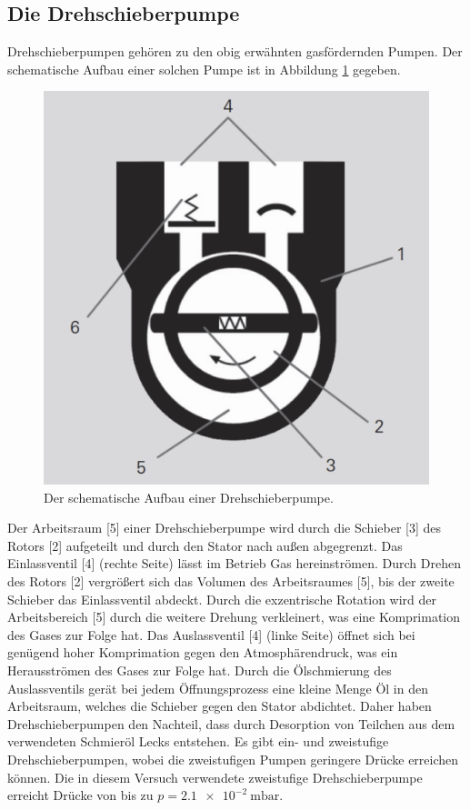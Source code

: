\subsection{Die Drehschieberpumpe}
Drehschieberpumpen gehören zu den obig erwähnten gasfördernden Pumpen. Der schematische
Aufbau einer solchen Pumpe ist in Abbildung \ref{fig:drehschieber} gegeben.
\begin{figure}[H]
  \centering
  \caption{Der schematische Aufbau einer Drehschieberpumpe.}
  \label{fig:drehschieber}
  \includegraphics[scale=0.3]{pictures/drehschieber.png}
\end{figure}
\noindent
Der Arbeitsraum [5] einer Drehschieberpumpe wird durch die Schieber [3] des
Rotors [2] aufgeteilt und durch den Stator nach außen abgegrenzt.
Das Einlassventil [4] (rechte Seite) lässt im Betrieb Gas hereinströmen.
Durch Drehen des Rotors [2] vergrößert sich das Volumen des Arbeitsraumes [5], bis der zweite Schieber
das Einlassventil abdeckt. Durch die exzentrische Rotation wird der Arbeitsbereich [5] durch die
weitere Drehung verkleinert, was eine Komprimation des Gases zur Folge hat. Das Auslassventil [4] (linke Seite)
öffnet sich bei genügend hoher Komprimation gegen den Atmosphärendruck, was ein Herausströmen des Gases zur
Folge hat. Durch die Ölschmierung des Auslassventils gerät bei jedem Öffnungsprozess eine
kleine Menge Öl in den Arbeitsraum, welches die Schieber gegen den Stator abdichtet. Daher haben
Drehschieberpumpen den Nachteil, dass durch Desorption von Teilchen aus dem verwendeten Schmieröl Lecks
entstehen. Es gibt ein- und
zweistufige Drehschieberpumpen, wobei die zweistufigen Pumpen geringere Drücke erreichen können.
Die in diesem Versuch verwendete zweistufige Drehschieberpumpe erreicht Drücke
von bis zu $p = \SI{2.1 e-2}{\milli\bar}$.

